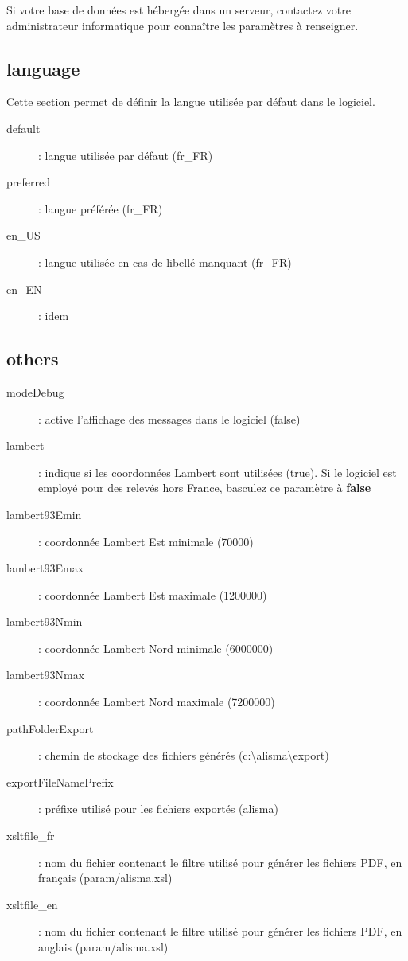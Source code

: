 Si votre base de données est hébergée dans un serveur, contactez votre administrateur informatique pour connaître les paramètres à renseigner.

\subsection{language}

Cette section permet de définir la langue utilisée par défaut dans le logiciel.

\begin{description}
\item [default] : langue utilisée par défaut (fr\_FR)
\item [preferred] : langue préférée (fr\_FR)
\item[en\_US]: langue utilisée en cas de libellé manquant (fr\_FR)
\item [en\_EN] : idem
\end{description}


\subsection{others}

\begin{description}
\item [modeDebug] : active l'affichage des messages dans le logiciel (false)
\item [lambert] : indique si les coordonnées Lambert sont utilisées (true). Si le logiciel est employé pour des relevés hors France, basculez ce paramètre à \textbf{false}
\item [lambert93Emin] : coordonnée Lambert Est minimale (70000)
\item [lambert93Emax] : coordonnée Lambert Est maximale (1200000)
\item [lambert93Nmin] : coordonnée Lambert Nord minimale (6000000)
\item [lambert93Nmax] : coordonnée Lambert Nord maximale (7200000)
\item [pathFolderExport] : chemin de stockage des fichiers générés (c:\textbackslash{}alisma\textbackslash{}export)
\item [exportFileNamePrefix] : préfixe utilisé pour les fichiers exportés (alisma)
\item [xsltfile\_fr] : nom du fichier contenant le filtre utilisé pour générer les fichiers PDF, en français (param/alisma.xsl)
\item [xsltfile\_en] : nom du fichier contenant le filtre utilisé pour générer les fichiers PDF, en anglais (param/alisma.xsl)

\end{description}

